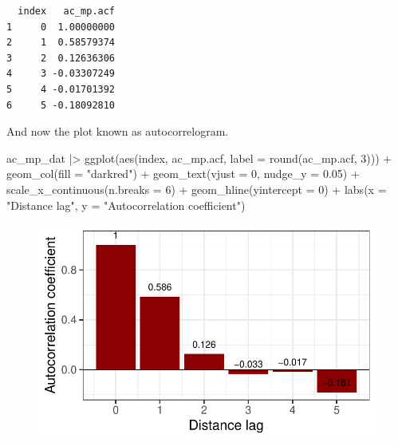 \documentclass[
  letterpaper,
  DIV=11,
  numbers=noendperiod]{scrreprt}
\newenvironment{Shaded}{\begin{snugshade}}{\end{snugshade}}
\newcommand{\AttributeTok}[1]{\textcolor[rgb]{0.40,0.45,0.13}{#1}}
\newcommand{\DecValTok}[1]{\textcolor[rgb]{0.68,0.00,0.00}{#1}}
\newcommand{\FloatTok}[1]{\textcolor[rgb]{0.68,0.00,0.00}{#1}}
\newcommand{\FunctionTok}[1]{\textcolor[rgb]{0.28,0.35,0.67}{#1}}
\newcommand{\NormalTok}[1]{\textcolor[rgb]{0.00,0.23,0.31}{#1}}
\newcommand{\SpecialCharTok}[1]{\textcolor[rgb]{0.37,0.37,0.37}{#1}}
\newcommand{\StringTok}[1]{\textcolor[rgb]{0.13,0.47,0.30}{#1}}
\begin{document}
\begin{verbatim}
  index   ac_mp.acf
1     0  1.00000000
2     1  0.58579374
3     2  0.12636306
4     3 -0.03307249
5     4 -0.01701392
6     5 -0.18092810
\end{verbatim}

And now the plot known as autocorrelogram.

\begin{Shaded}
\begin{Highlighting}[]
\NormalTok{ac\_mp\_dat }\SpecialCharTok{|\textgreater{}}
  \FunctionTok{ggplot}\NormalTok{(}\FunctionTok{aes}\NormalTok{(index, ac\_mp.acf, }\AttributeTok{label =} \FunctionTok{round}\NormalTok{(ac\_mp.acf, }\DecValTok{3}\NormalTok{))) }\SpecialCharTok{+}
  \FunctionTok{geom\_col}\NormalTok{(}\AttributeTok{fill =} \StringTok{"darkred"}\NormalTok{) }\SpecialCharTok{+}
  \FunctionTok{geom\_text}\NormalTok{(}\AttributeTok{vjust =} \DecValTok{0}\NormalTok{, }\AttributeTok{nudge\_y =} \FloatTok{0.05}\NormalTok{) }\SpecialCharTok{+}
  \FunctionTok{scale\_x\_continuous}\NormalTok{(}\AttributeTok{n.breaks =} \DecValTok{6}\NormalTok{) }\SpecialCharTok{+}
  \FunctionTok{geom\_hline}\NormalTok{(}\AttributeTok{yintercept =} \DecValTok{0}\NormalTok{) }\SpecialCharTok{+}
  \FunctionTok{labs}\NormalTok{(}\AttributeTok{x =} \StringTok{"Distance lag"}\NormalTok{, }\AttributeTok{y =} \StringTok{"Autocorrelation coefficient"}\NormalTok{)}
\end{Highlighting}
\end{Shaded}

\begin{figure}[H]

{\centering \includegraphics{./spatial-tests_files/figure-pdf/unnamed-chunk-50-1.pdf}

}

\end{figure}
\end{document}
